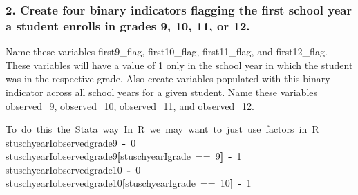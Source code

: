 \documentclass[12pt]{article}
\makeatletter
\newcommand{\hlnumber}[1]{\textcolor[rgb]{0,0,0}{#1}}%
\newcommand{\hlkeyword}[1]{\textcolor[rgb]{0,0,0}{\textbf{#1}}}%
\newcommand{\hlcomment}[1]{\textcolor[rgb]{0.180392156862745,0.6,0.341176470588235}{#1}}%
\newcommand{\hlassignement}[1]{\textcolor[rgb]{0,0,0}{\textbf{#1}}}%
\newcommand{\hlsymbol}[1]{\textcolor[rgb]{0,0,0}{#1}}%
\newcommand{\hlstd}[1]{\textcolor[rgb]{0,0,0}{#1}}%
\newenvironment{kframe}{%
 \def\FrameCommand##1{\hskip\@totalleftmargin \hskip-\fboxsep
 \colorbox{shadecolor}{##1}\hskip-\fboxsep
     \hskip-\linewidth \hskip-\@totalleftmargin \hskip\columnwidth}%
 \MakeFramed {\advance\hsize-\width
   \@totalleftmargin\z@ \linewidth\hsize
   \@setminipage}}%
 {\par\unskip\endMakeFramed}
\newenvironment{knitrout}{}{} %
\renewenvironment{knitrout}{\begin{footnotesize}}{\end{footnotesize}}
\makeatother
\begin{document}
\subsubsection {2. Create four binary indicators flagging the first school year a student enrolls in grades 9, 10, 11, or 12.} Name these 
variables first9\_flag, first10\_flag, first11\_flag, and first12\_flag. These variables will have a value of 1 only in the school year 
in which the student was in the respective grade.  Also create variables populated with this binary indicator across all school 
years for a given student. Name these variables  observed\_9, observed\_10, observed\_11, and observed\_12.
\label{sec:task3sub2}
\begin{knitrout}
\color{fgcolor}\begin{kframe}
\begin{flushleft}
\ttfamily\noindent
\hlcomment{\usebox{\hlnormalsizeboxhash}{\ }To{\ }do{\ }this{\ }the{\ }Stata{\ }way{\ }In{\ }R{\ }we{\ }may{\ }want{\ }to{\ }just{\ }use{\ }factors{\ }in{\ }R}\hspace*{\fill}\\
\hlstd{}\hlsymbol{stuschyearI}\hlkeyword{\usebox{\hlnormalsizeboxdollar}}\hlsymbol{observed\usebox{\hlnormalsizeboxunderscore}grade\usebox{\hlnormalsizeboxunderscore}9}{\ }\hlassignement{\usebox{\hlnormalsizeboxlessthan}-}{\ }\hlnumber{0}\hspace*{\fill}\\
\hlstd{}\hlsymbol{stuschyearI}\hlkeyword{\usebox{\hlnormalsizeboxdollar}}\hlsymbol{observed\usebox{\hlnormalsizeboxunderscore}grade\usebox{\hlnormalsizeboxunderscore}9}\hlkeyword{[}\hlsymbol{stuschyearI}\hlkeyword{\usebox{\hlnormalsizeboxdollar}}\hlsymbol{grade}{\ }=={\ }\hlnumber{9}\hlkeyword{]}{\ }\hlassignement{\usebox{\hlnormalsizeboxlessthan}-}{\ }\hlnumber{1}\hspace*{\fill}\\
\hlstd{}\hlsymbol{stuschyearI}\hlkeyword{\usebox{\hlnormalsizeboxdollar}}\hlsymbol{observed\usebox{\hlnormalsizeboxunderscore}grade\usebox{\hlnormalsizeboxunderscore}10}{\ }\hlassignement{\usebox{\hlnormalsizeboxlessthan}-}{\ }\hlnumber{0}\hspace*{\fill}\\
\hlstd{}\hlsymbol{stuschyearI}\hlkeyword{\usebox{\hlnormalsizeboxdollar}}\hlsymbol{observed\usebox{\hlnormalsizeboxunderscore}grade\usebox{\hlnormalsizeboxunderscore}10}\hlkeyword{[}\hlsymbol{stuschyearI}\hlkeyword{\usebox{\hlnormalsizeboxdollar}}\hlsymbol{grade}{\ }=={\ }\hlnumber{10}\hlkeyword{]}{\ }\hlassignement{\usebox{\hlnormalsizeboxlessthan}-}{\ }\hlnumber{1}\hspace*{\fill}\\

\end{flushleft}
\end{kframe}
\end{knitrout}
\end{document}
